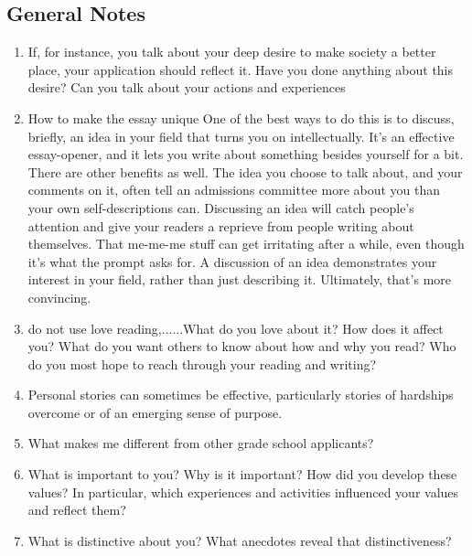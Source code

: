 \documentclass[a4paper,12pt]{article}%
\begin{document}
\subsection{General Notes}
\label{sec:General}
  \begin{enumerate}
	\item  If, for instance, you talk about your deep desire to make society a better place, your application should reflect it. Have you done anything about this desire? Can you talk about your actions and experiences
 
	  \hrulefill
	  
	  \hrulefill
	  
	  	  \hrulefill
	  	  
	  \hrulefill
\item How to make the essay unique 
 One of the best ways to do this is to discuss, briefly, an idea in your field that turns you on intellectually. It's an effective essay-opener, and it lets you write about something besides yourself for a bit. There are other benefits as well. The idea you choose to talk about, and your comments on it, often tell an admissions committee more about you than your own self-descriptions can.
Discussing an idea will catch people's attention and give your readers a reprieve from people writing about themselves. That me-me-me  stuff can get irritating after a while, even though it's what the prompt asks for. A discussion of an idea demonstrates your interest in your field, rather than just describing it. Ultimately, that's more convincing.

	  \hrulefill
	  
	  \hrulefill
\item do not use love reading,......What do you love about it? How does it affect you? What do you want others to know about how and why you read? Who do you most hope to reach through your reading and writing?

	  \hrulefill
	  
	  \hrulefill
	  
\item Personal stories can sometimes be effective, particularly stories of hardships overcome or of an emerging sense of purpose. 
\item  	What makes me different from other grade school applicants?
\item What is important to you? Why is it important? How did you develop these values? In particular, which  experiences and activities influenced your values and reflect them?
\item What is distinctive about you? What anecdotes reveal that distinctiveness?



\end{enumerate}
\end{document}
